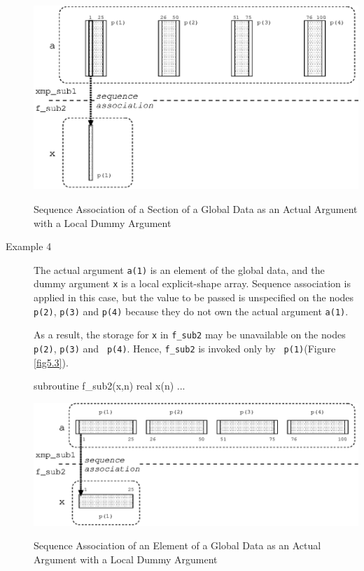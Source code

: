 \begin{description}
\clearpage

\begin{myfigure}
 \includegraphics[scale=0.7]{figs/fig5.25.eps}
 \caption{Sequence Association of a Section of a Global Data as an
 Actual Argument with a Local Dummy Argument}
 \label{fig5.25}
\end{myfigure}

\item[Example 4]

	   The actual argument {\tt a(1)} is an element of the global
	   data, and the dummy argument {\tt x} is a local
	   explicit-shape array. Sequence association is applied 
	   in this case, but the value to be passed is unspecified on 
	   the nodes {\tt p(2)}, {\tt p(3)} and {\tt p(4)} because they
	   do not own the actual argument {\tt a(1)}.

	   As a result, the storage for {\tt x} in {\tt f\_sub2} may be
	   unavailable on the nodes {\tt p(2)}, {\tt p(3)} and {\tt
	   p(4)}. Hence, {\tt f\_sub2} is invoked only by {\tt
	   p(1)}(Figure \ref{fig5.3}).

%
\begin{Fexample}
      subroutine f_sub2(x,n)
      real x(n)
      ...
\end{Fexample}

\begin{myfigure}
 \includegraphics[scale=0.7]{figs/fig5.3.eps}
 \caption{Sequence Association of an Element of a Global Data as an
 Actual Argument with a Local Dummy Argument}
 \label{fig5.3}
\end{myfigure}


\end{description}
